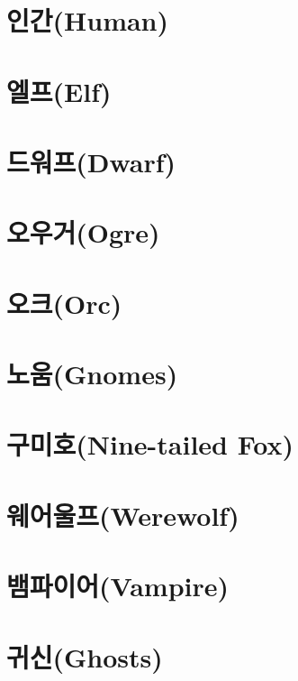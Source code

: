 \documentclass{report}
\begin{document}
	\section{인간(Human)}
		
	
	\section{엘프(Elf)}
		
	
	\section{드워프(Dwarf)}
		
	
	\section{오우거(Ogre)}
		
	
	\section{오크(Orc)}
		
	
	\section{노움(Gnomes)}
		
	
	\section{구미호(Nine-tailed Fox)}
		
	
	\section{웨어울프(Werewolf)}
		
	
	\hypertarget{species:vampire}{}
	\section{뱀파이어(Vampire)}
		
	
	\hypertarget{species:ghost}{}
	\section{귀신(Ghosts)}
		
	
\end{document}
